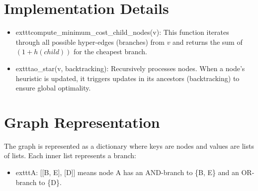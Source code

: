 \documentclass[12pt]{article}
\begin{document}
\section{Implementation Details}
\begin{itemize}
    \item 	exttt{compute\_minimum\_cost\_child\_nodes(v)}: This function iterates through all possible hyper-edges (branches) from $v$ and returns the sum of $(1 + h(child))$ for the cheapest branch.
    \item 	exttt{ao\_star(v, backtracking)}: Recursively processes nodes. When a node's heuristic is updated, it triggers updates in its ancestors (backtracking) to ensure global optimality.
\end{itemize}

\section{Graph Representation}
The graph is represented as a dictionary where keys are nodes and values are lists of lists. Each inner list represents a branch:
\begin{itemize}
    \item 	exttt{A: [[B, E], [D]]} means node A has an AND-branch to \{B, E\} and an OR-branch to \{D\}.
\end{itemize}
\end{document}
